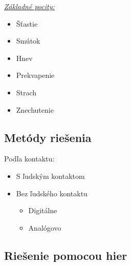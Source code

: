 \documentclass[10pt,twoside,slovak,a4paper]{article}
\begin{document}
\underline{\emph{ Základné pocity:}}
\begin{itemize}
\item Šťastie
\item Smútok
\item Hnev
\item Prekvapenie
\item Strach
\item Znechutenie	
\end{itemize}





\subsection{Metódy riešenia} \label{problematika:metody}

Podľa kontaktu:

\begin{itemize}
\item S ľudským kontaktom
\item Bez ľudského kontaktu
	\begin{itemize}
	\item Digitálne
	\item Analógovo
	\end{itemize}
\end{itemize}





\subsection{Riešenie pomocou hier} \label{problematika:hry}
\end{document}
